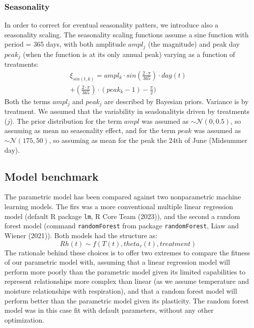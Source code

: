 \documentclass[
]{article}
\begin{document}
\subsubsection{Seasonality}\label{seasonality}

In order to correct for eventual seasonality patters, we introduce also a seasonality scaling.
The seasonality scaling functions assume a sine function with period = 365 days, with both amplitude \(ampl_j\) (the magnitude) and peak day \(peak_j\) (when the function is at its only annual peak) varying as a function of treatments:
\[
\begin{aligned}
    \xi_{sin(t,k)} = ampl_k \cdot sin \left(\frac{2 \cdot \pi}{365}\right) \cdot day(t) \\
    +\left(\frac{2 \cdot \pi}{365}\right) \cdot (peak_k - 1) - \frac{\pi}{2})
\end{aligned}
\]
Both the terms \(ampl_j\) and \(peak_j\) are described by Bayesian priors. Variance is by treatment.
We assumed that the variability in seaslonalityis driven by treatments (\(j\)).
The prior distribution for the term \(ampl\) was assumed as \(\sim \mathcal{N}(0, 0.5)\), so assuming as mean no seasonality effect, and for the term \(peak\) was assumed as \(\sim \mathcal{N}(175, 50)\), so assuming as mean for the peak the 24th of June (Midsummer day).

\subsection{Model benchmark}\label{model-benchmark}

The parametric model has been compared against two nonparametric machine learning models. The firs was a more conventional multiple linear regression model (default R package \texttt{lm}, R Core Team (2023)), and the second a random forest model (command \texttt{randomForest} from package \texttt{randomForest}, Liaw and Wiener (2021)). Both models had the structure as:\\
\[
Rh(t) \sim f(T(t), theta_v(t), treatment)
\]
The rationale behind these choices is to offer two extremes to compare the fitness of our parametric model with, assuming that a linear regression model will perform more poorly than the parametric model given its limited capabilities to represent relationships more complex than linear (as we assume temperature and moisture relationships with respiration), and that a random forest model will perform better than the parametric model given its plasticity. The random forest model was in this case fit with default parameters, without any other optimization.
\end{document}
